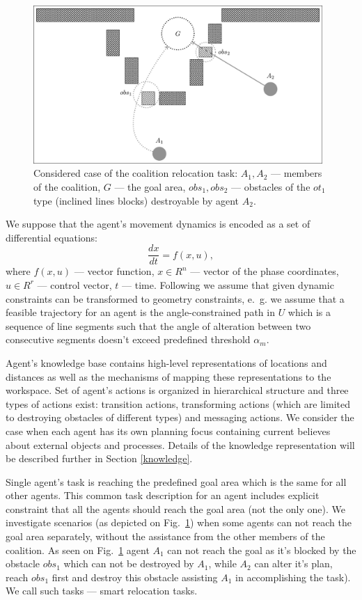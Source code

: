 \documentclass[runningheads,a4paper]{llncs}
\begin{document}
\begin{figure}[h]
	\centering
	\includegraphics[height=6cm]{rita_example}
	\caption{Considered case of the coalition relocation task: $A_1,A_2$ --- members of the coalition, $G$ --- the goal area, $obs_1, obs_2$ --- obstacles of the $ot_1$ type (inclined lines blocks) destroyable by agent $A_2$.}
	\label{fig:case}
\end{figure}

We suppose that the agent's movement dynamics is encoded as a set of differential equations:
\begin{equation}
	\frac{dx}{dt} = f(x,u),
\end{equation}
where $f(x,u)$ --- vector function, $x\in R^n$ --- vector of the phase coordinates, $u\in R^r$ --- control vector, $t$ --- time. Following \cite{Yakovlev2015a} we assume that given dynamic constraints can be transformed to geometry constraints, e.~g. we assume that a feasible trajectory for an agent is the angle-constrained path in $U$ which is a sequence of line segments such that the angle of alteration between two consecutive segments doesn't exceed predefined threshold $\alpha_m$.

Agent's knowledge base contains high-level representations of locations and distances as well as the mechanisms of mapping these representations to the workspace. Set of agent's actions is organized in hierarchical structure and three types of actions exist: transition actions, transforming actions (which are limited to destroying obstacles of different types) and messaging actions. We consider the case when each agent has its own planning focus containing current believes about external objects and processes. Details of the knowledge representation will be described further in Section \ref{knowledge}.

Single agent's task is reaching the predefined goal area which is the same for all other agents. This common task description for an agent includes explicit constraint that all the agents should reach the goal area (not the only one). We investigate scenarios (as depicted on Fig.~\ref{fig:case}) when some agents can not reach the goal area separately, without the assistance from the other members of the coalition. As seen on Fig.~\ref{fig:case} agent $A_1$ can not reach the goal as it's blocked by the obstacle $obs_1$ which can not be destroyed by $A_1$, while $A_2$ can alter it's plan, reach $obs_1$ first and destroy this obstacle assisting $A_1$ in accomplishing the task). We call such tasks --- smart relocation tasks.
\end{document}
